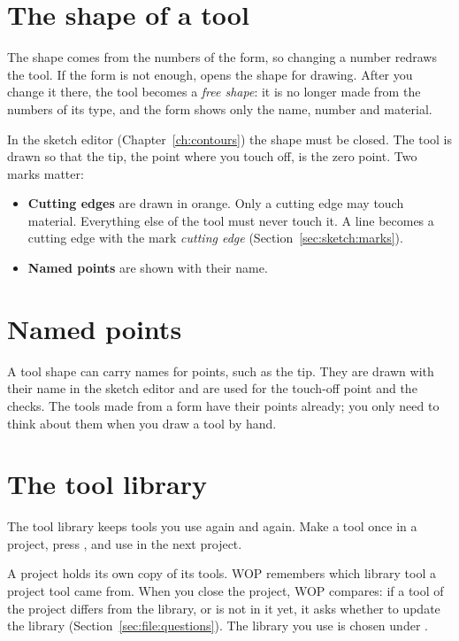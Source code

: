 \section{The shape of a tool}\label{sec:tools:shape}
The shape comes from the numbers of the form, so changing a number redraws the tool. If the form is not enough,  opens the shape for drawing. After you change it there, the tool becomes a \emph{free shape}: it is no longer made from the numbers of its type, and the form shows only the name, number and material.

In the sketch editor (Chapter~\ref{ch:contours}) the shape must be closed. The tool is drawn so that the tip, the point where you touch off, is the zero point. Two marks matter:
\begin{itemize}
  \item \textbf{Cutting edges} are drawn in orange. Only a cutting edge may touch material. Everything else of the tool must never touch it. A line becomes a cutting edge with the mark \emph{cutting edge} (Section~\ref{sec:sketch:marks}).
  \item \textbf{Named points} are shown with their name.
\end{itemize}

\section{Named points}\label{sec:tools:points}
A tool shape can carry names for points, such as the tip. They are drawn with their name in the sketch editor and are used for the touch-off point and the checks. The tools made from a form have their points already; you only need to think about them when you draw a tool by hand.

\section{The tool library}\label{sec:tools:library}
The tool library keeps tools you use again and again. Make a tool once in a project, press , and use  in the next project.

A project holds its own copy of its tools. WOP remembers which library tool a project tool came from. When you close the project, WOP compares: if a tool of the project differs from the library, or is not in it yet, it asks whether to update the library (Section~\ref{sec:file:questions}). The library you use is chosen under .

